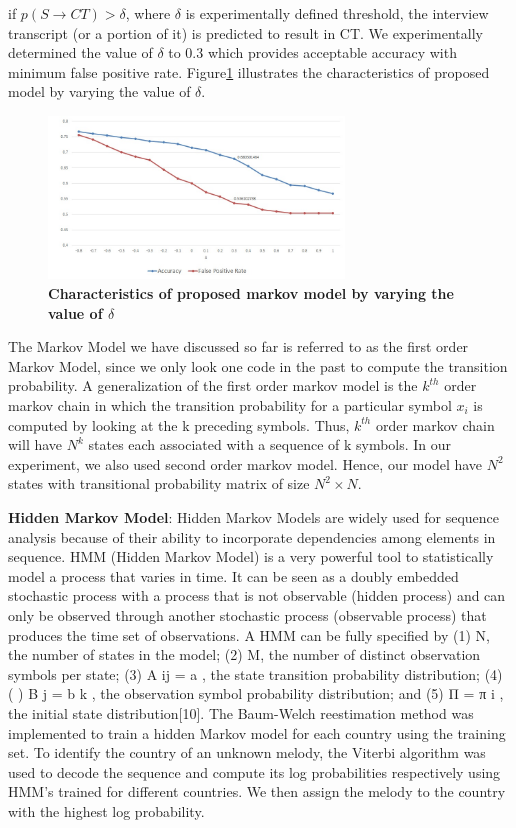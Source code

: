 \documentclass{amia}
\begin{document}
if $p(S\rightarrow CT) > \delta $, where $\delta$ is experimentally defined threshold, the interview transcript (or a portion of it) is predicted to result in CT. We experimentally determined the value of $\delta$ to 0.3 which provides acceptable accuracy with minimum false positive rate. Figure\ref{fig:delta} illustrates the characteristics of proposed model by varying the value of $\delta$. 

\begin{figure}[htb!]
    \centering
    \includegraphics[width=0.70\textwidth]{figures/deltadata.png}
    \caption{\textbf{Characteristics of proposed markov model by varying the value of $\delta$}}
    \label{fig:delta}
\end{figure}

The Markov Model we have discussed so far is referred to as the first order Markov Model, since we only look one code in the past to compute the transition probability. A generalization of the first order markov model is the $k^{th}$ order markov chain in which the transition probability for a particular symbol $x_i$ is computed by looking at the k preceding symbols. Thus, $k^{th}$ order markov chain will have $N^{k}$ states each associated with a sequence of k symbols. In our experiment, we also used second order markov model. Hence, our model have $N^2$ states with transitional probability matrix of size $N^2 \times N$.  

\textbf {Hidden Markov Model}: Hidden Markov Models are widely used for sequence analysis because of their ability to incorporate dependencies among elements in sequence. HMM (Hidden Markov Model) is a very
powerful tool to statistically model a process that varies in time. It can be seen as a doubly embedded stochastic process with a process that is not observable (hidden process) and can only be observed through another stochastic process (observable process) that produces the time set of observations. A HMM can be fully specified by (1) N, the number of states in the model; (2) M, the number of distinct observation symbols per state; (3) { } A ij = a , the state transition probability distribution; (4) { ( )} B j = b k , the observation symbol probability distribution; and (5) { } Π = π i , the initial state distribution[10]. The Baum-Welch reestimation method was implemented to train a hidden Markov model for each country using the training set. To identify the country of an unknown melody, the Viterbi algorithm was used to decode the sequence and compute its log probabilities respectively using HMM’s trained for different countries. We then assign the melody to the country with the highest log probability.  
\end{document}
